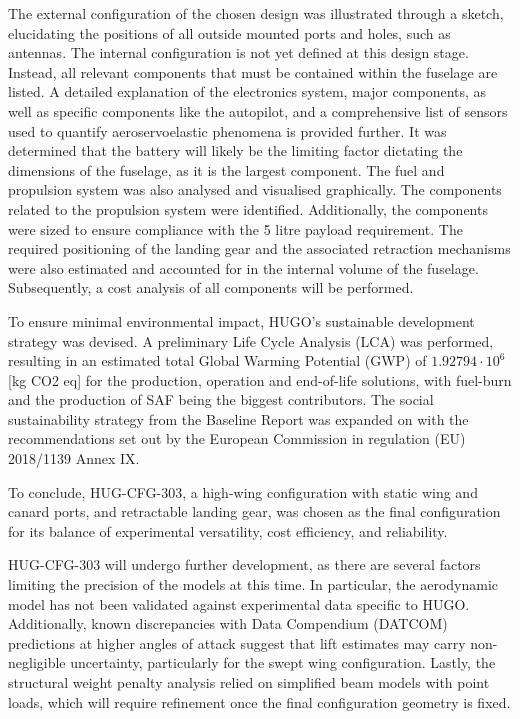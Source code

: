 The external configuration of the chosen design was illustrated through a sketch, elucidating the positions of all outside mounted ports and holes, such as antennas. The internal configuration is not yet defined at this design stage. Instead, all relevant components that must be contained within the fuselage are listed. A detailed explanation of the electronics system, major components, as well as specific components like the autopilot, and a comprehensive list of sensors used to quantify aeroservoelastic phenomena is provided further. It was determined that the battery will likely be the limiting factor dictating the dimensions of the fuselage, as it is the largest component. The fuel and propulsion system was also analysed and visualised graphically. The components related to the propulsion system were identified. Additionally, the components were sized to ensure compliance with the 5 litre payload requirement. The required positioning of the landing gear and the associated retraction mechanisms were also estimated and accounted for in the internal volume of the fuselage. Subsequently, a cost analysis of all components will be performed.

To ensure minimal environmental impact, HUGO's sustainable development strategy was devised. A preliminary Life Cycle Analysis (LCA) was performed, resulting in an estimated total Global Warming Potential (GWP) of $1.92794\cdot10^{6}$ [kg CO2 eq] for the production, operation and end-of-life solutions, with fuel-burn and the production of SAF being the biggest contributors. The social sustainability strategy from the Baseline Report was expanded on with the recommendations set out by the European Commission in regulation (EU) 2018/1139 Annex IX.

To conclude, HUG-CFG-303, a high-wing configuration with static wing and canard
ports, and retractable landing gear, was chosen as the final configuration for its balance of experimental versatility, cost efficiency, and reliability.

HUG-CFG-303 will undergo further development, as there are several factors limiting the precision of the models at this time. In particular, the aerodynamic model has not been validated against experimental data specific to HUGO. Additionally, known discrepancies with Data Compendium (DATCOM) predictions at higher angles of attack suggest that lift estimates may carry non-negligible uncertainty, particularly for the swept wing configuration. Lastly, the structural weight penalty analysis relied on simplified beam models with point loads, which will require refinement once the final configuration geometry is fixed.

